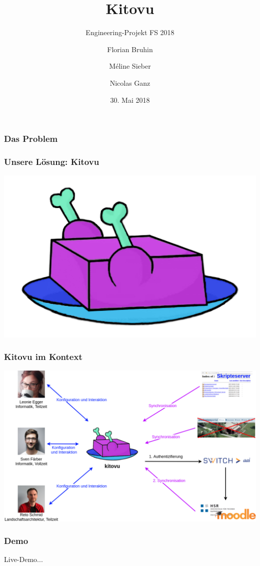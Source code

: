 \documentclass{beamer}
\title{Kitovu %
}
\subtitle{Engineering-Projekt FS 2018}
\author{Florian Bruhin \and Méline Sieber \and Nicolas Ganz}
\institute{HSR Hochschule für Technik Rapperswil}
\date{30. Mai 2018}
\begin{document}
  \frame{\titlepage}

  \begin{frame}
    \frametitle{Das Problem}
  \end{frame}

  \begin{frame}
    \frametitle{Unsere Lösung: Kitovu}
    \begin{center}
    \includegraphics[width=0.5\linewidth]{../../img/logo/kitovu.jpg}
    \end{center}
  \end{frame}

  \begin{frame}
    \frametitle{Kitovu im Kontext}
    \includegraphics[width=\linewidth]{../03_End_of_Elaboration/img/kontextdiagramm.png}
  \end{frame}

  \begin{frame}
    \frametitle{Demo}
    Live-Demo...
  \end{frame}
\end{document}
